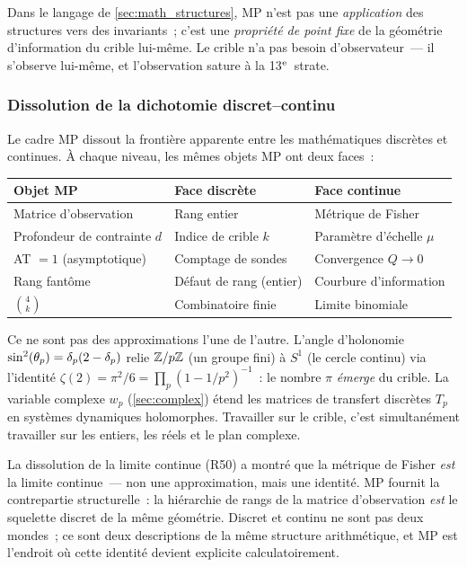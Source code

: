 \documentclass[12pt,a4paper]{article}
\begin{document}
\begin{remarque}
Dans le langage de \cref{sec:math_structures}, MP n'est pas une
\emph{application} des structures vers des invariants~; c'est une
\emph{propriété de point fixe} de la géométrie d'information du
crible lui-même. Le crible n'a pas besoin d'observateur~--- il
s'observe lui-même, et l'observation sature à la 13$^{\rm e}$~strate.
\end{remarque}

\subsubsection{Dissolution de la dichotomie discret--continu}

Le cadre MP dissout la frontière apparente entre les mathématiques
discrètes et continues. À chaque niveau, les mêmes objets MP ont
deux faces~:

\begin{center}
\begin{tabular}{lll}
\toprule
\textbf{Objet MP} & \textbf{Face discrète} & \textbf{Face continue} \\
\midrule
Matrice d'observation & Rang entier & Métrique de Fisher \\
Profondeur de contrainte $d$ & Indice de crible $k$ & Paramètre d'échelle $\mu$ \\
AT $= 1$ (asymptotique) & Comptage de sondes & Convergence $Q \to 0$ \\
Rang fantôme & Défaut de rang (entier) & Courbure d'information \\
$\binom{4}{k}$ & Combinatoire finie & Limite binomiale \\
\bottomrule
\end{tabular}
\end{center}

\noindent
Ce ne sont pas des approximations l'une de l'autre. L'angle
d'holonomie $\sin^2(\theta_{p}) = \delta_p(2 - \delta_p)$ relie $\mathbb{Z}/p\mathbb{Z}$ (un
groupe fini) à $S^1$ (le cercle continu) via l'identité
$\zeta(2) = \pi^2/6 = \prod_p (1 - 1/p^2)^{-1}$~: le nombre $\pi$
\emph{émerge} du crible. La variable complexe $w_p$
(\cref{sec:complex}) étend les matrices de transfert discrètes
$T_p$ en systèmes dynamiques holomorphes. Travailler sur le crible,
c'est simultanément travailler sur les entiers, les réels et le plan
complexe.

\begin{remarque}
La dissolution de la limite continue (R50) a montré que la métrique
de Fisher \emph{est} la limite continue~--- non une approximation,
mais une identité. MP fournit la contrepartie structurelle~: la
hiérarchie de rangs de la matrice d'observation \emph{est} le
squelette discret de la même géométrie. Discret et continu ne sont
pas deux mondes~; ce sont deux descriptions de la même structure
arithmétique, et MP est l'endroit où cette identité devient
explicite calculatoirement.
\end{remarque}
\end{document}
